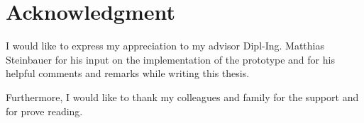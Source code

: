 \chapter*{Acknowledgment}

\ifx\manuscriptmode\undefined{}

I would like to express my appreciation to my advisor Dipl-Ing. Matthias Steinbauer for his input on the implementation of the prototype and for his helpful comments and remarks while writing this thesis.

Furthermore, I would like to thank my colleagues and family for the support and for prove reading.
\fi

